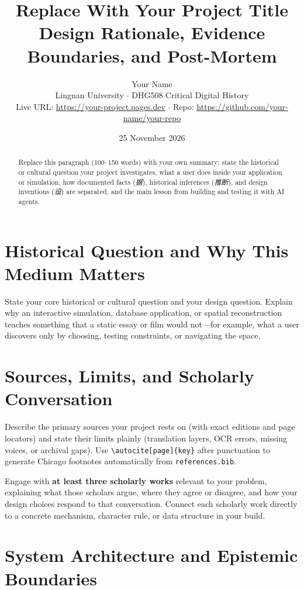 \documentclass[12pt,a4paper]{article}
\title{\textbf{Replace With Your Project Title}\\[0.3em]
\large Design Rationale, Evidence Boundaries, and Post-Mortem}
\author{Your Name\\Lingnan University $\cdot$ DHG508 Critical Digital History\\
\small Live URL: \url{https://your-project.pages.dev} $\cdot$ Repo: \url{https://github.com/your-name/your-repo}}
\date{25 November 2026}
\begin{document}
\maketitle

\begin{abstract}
\noindent
Replace this paragraph (100--150 words) with your own summary: state the historical
or cultural question your project investigates, what a user does inside your
application or simulation, how documented facts (\emph{据}), historical inferences
(\emph{推断}), and design inventions (\emph{设}) are separated, and the main lesson
from building and testing it with AI agents.
\end{abstract}

\onehalfspacing

\section{Historical Question and Why This Medium Matters}

State your core historical or cultural question and your design question. Explain
why an interactive simulation, database application, or spatial reconstruction
teaches something that a static essay or film would not---for example, what a user
discovers only by choosing, testing constraints, or navigating the space.

\section{Sources, Limits, and Scholarly Conversation}

Describe the primary sources your project rests on (with exact editions and page
locators) and state their limits plainly (translation layers, OCR errors, missing
voices, or archival gaps).\autocite[150, 152]{tobin1986macro} Use \verb|\autocite[page]{key}|
after punctuation to generate Chicago footnotes automatically from \texttt{references.bib}.\autocite{conference1986}

Engage with \textbf{at least three scholarly works} relevant to your problem,
explaining what those scholars argue, where they agree or disagree, and how your
design choices respond to that conversation.\autocite[158--160]{gewirtz2017unlikely}
Connect each scholarly work directly to a concrete mechanism, character rule, or
data structure in your build.\autocite[195--199]{weber2021shock}

\section{System Architecture and Epistemic Boundaries}
\end{document}
